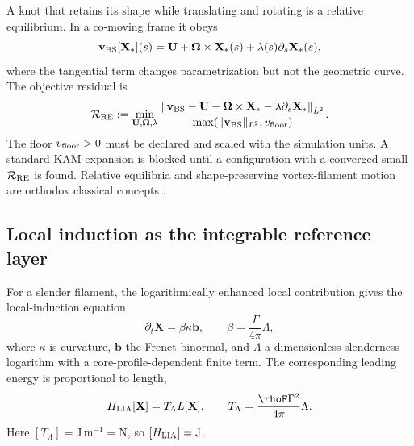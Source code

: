 A knot that retains its shape while translating and rotating is a relative
equilibrium.  In a co-moving frame it obeys
\begin{equation}
    \mathbf v_{\rm BS}[\mathbf X_*](s)
    =
    \mathbf U
    +
    \boldsymbol\Omega\times\mathbf X_*(s)
    +
    \lambda(s)\partial_s\mathbf X_*(s),
    \label{eq:rt_kam_relative_equilibrium_condition}
\end{equation}
where the tangential term changes parametrization but not the geometric curve.
The objective residual is
\begin{equation}
    \mathcal R_{\rm RE}
    :=
    \min_{\mathbf U,\boldsymbol\Omega,\lambda}
    \frac{
    \left\lVert
    \mathbf v_{\rm BS}
    -\mathbf U
    -\boldsymbol\Omega\times\mathbf X_*
    -\lambda\partial_s\mathbf X_*
    \right\rVert_{L^2}
    }{
    \max\!\left(
    \lVert\mathbf v_{\rm BS}\rVert_{L^2},
    v_{\rm floor}
    \right)
    }.
    \label{eq:rt_kam_relative_equilibrium_residual}
\end{equation}
The floor \(v_{\rm floor}>0\) must be declared and scaled with the simulation
units.  A standard KAM expansion is blocked until a configuration with a
converged small \(\mathcal R_{\rm RE}\) is found.  Relative equilibria and
shape-preserving vortex-filament motion are orthodox classical concepts
\cite{Kida1981VortexFilamentForm}.

\subsection{Local induction as the integrable reference layer}
\label{subsec:rt_kam_lia_reference}

For a slender filament, the logarithmically enhanced local contribution gives
the local-induction equation
\begin{equation}
    \partial_t\mathbf X
    =
    \beta\kappa\mathbf b,
    \qquad
    \beta
    =
    \frac{\Gamma}{4\pi}\Lambda,
    \label{eq:rt_kam_lia_equation}
\end{equation}
where \(\kappa\) is curvature, \(\mathbf b\) the Frenet binormal, and
\(\Lambda\) a dimensionless slenderness logarithm with a core-profile-dependent
finite term.  The corresponding leading energy is proportional to length,
\begin{equation}
    H_{\rm LIA}[\mathbf X]
    =
    T_{\Lambda}L[\mathbf X],
    \qquad
    T_{\Lambda}
    =
    \frac{\rhoF\Gamma^2}{4\pi}\Lambda.
    \label{eq:rt_kam_lia_hamiltonian}
\end{equation}
Here \([T_{\Lambda}]=\mathrm{J\,m^{-1}}=\mathrm N\), so
\([H_{\rm LIA}]=\mathrm J\).

